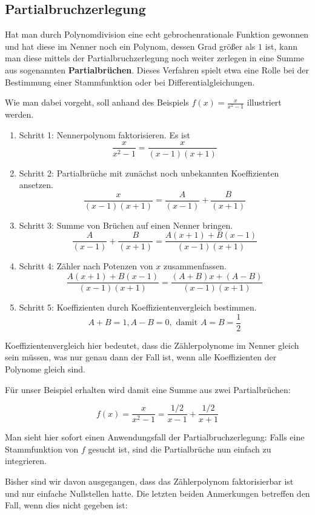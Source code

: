 \subsection{Partialbruchzerlegung}

Hat man durch Polynomdivision eine echt gebrochenrationale Funktion gewonnen und hat diese im Nenner noch ein Polynom, dessen Grad größer als $1$ ist, kann man diese mittels der Partialbruchzerlegung noch weiter zerlegen in eine Summe aus sogenannten \textbf{Partialbrüchen}. Dieses Verfahren spielt etwa eine Rolle bei der Bestimmung einer Stammfunktion oder bei Differentialgleichungen.

Wie man dabei vorgeht, soll anhand des Beispiels $f(x) = \frac{x}{x^2-1}$ illustriert werden.

\begin{enumerate}
    \item Schritt 1: Nennerpolynom faktorisieren. Es ist
    $$
        \frac{x}{x^2-1} = \frac{x}{(x-1)(x+1)}
    $$
    \item Schritt 2: Partialbrüche mit zunächst noch unbekannten Koeffizienten ansetzen.
    $$
        \frac{x}{(x-1)(x+1)} = \frac{A}{(x-1)} + \frac{B}{(x+1)}
    $$
    \item Schritt 3: Summe von Brüchen auf einen Nenner bringen.
    $$
        \frac{A}{(x-1)} + \frac{B}{(x+1)} = \frac{A(x+1) + B(x-1)}{(x-1)(x+1)}
    $$
    \item Schritt 4: Zähler nach Potenzen von $x$ zusammenfassen.
    $$
        \frac{A(x+1) + B(x-1)}{(x-1)(x+1)} = \frac{(A+B)x+(A-B)}{(x-1)(x+1)}
    $$
    \item Schritt 5: Koeffizienten durch Koeffizientenvergleich bestimmen.
    $$
        A+B=1, A-B=0, \text{ damit } A=B=\frac{1}{2}
    $$
\end{enumerate}

Koeffizientenvergleich hier bedeutet, dass die Zählerpolynome im Nenner gleich sein müssen, was nur genau dann der Fall ist, wenn alle Koeffizienten der Polynome gleich sind.

Für unser Beispiel erhalten wird damit eine Summe aus zwei Partialbrüchen:

$$
    f(x) = \frac{x}{x^2-1} = \frac{1/2}{x-1} + \frac{1/2}{x+1}
$$

Man sieht hier sofort einen Anwendungsfall der Partialbruchzerlegung: Falls eine Stammfunktion von $f$ gesucht ist, sind die Partialbrüche nun einfach zu integrieren.


Bisher sind wir davon ausgegangen, dass das Zählerpolynom faktorisierbar ist und nur einfache Nullstellen hatte. Die letzten beiden Anmerkungen betreffen den Fall, wenn dies nicht gegeben ist:

